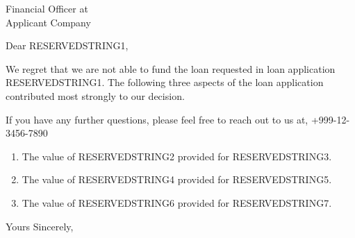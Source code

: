 \documentclass{letter}
\begin{document}
	
\address{%
	ACME Superior Lending Co. --TOTALLY FAKE\\
	12345 Common Road\\
    Somewhere on Earth 98765}
\signature{Jamie Doe\\
	Sr. Loan Officer \\
	Review Department\\
    ACME Superior Lending Co.}



\begin{letter}{Financial Officer at\\
	 Applicant Company}  %

\opening{Dear RESERVEDSTRING1,}

We regret that we are not able to fund the loan requested in loan application RESERVEDSTRING1.  The following three aspects of the loan application contributed most strongly to our decision.


If you have any further questions, please feel free to reach out to us at, +999-12-3456-7890

\begin{enumerate}
	\item  The value of RESERVEDSTRING2 provided for RESERVEDSTRING3.
	\item  The value of RESERVEDSTRING4 provided for RESERVEDSTRING5.
	\item  The value of RESERVEDSTRING6 provided for RESERVEDSTRING7.
\end{enumerate}

\closing{Yours Sincerely,}

\end{letter}
\end{document}
